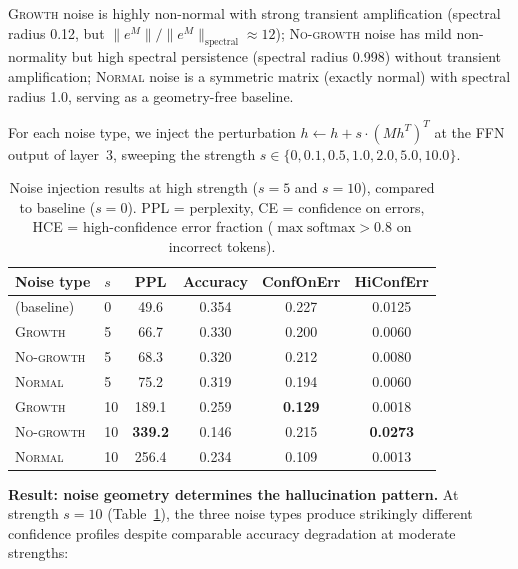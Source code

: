 \documentclass[11pt,a4paper]{article}
\theoremstyle{definition}
\begin{document}
\textsc{Growth} noise is highly non-normal with strong transient
amplification (spectral radius 0.12, but $\|e^M\|/\|e^M\|_{\text{spectral}} \approx 12$);
\textsc{No-growth} noise has mild non-normality but high spectral
persistence (spectral radius 0.998) without transient amplification;
\textsc{Normal} noise is a symmetric matrix (exactly normal) with
spectral radius 1.0, serving as a geometry-free baseline.

For each noise type, we inject the perturbation
$h \gets h + s \cdot (Mh^T)^T$ at the FFN output of layer~3, sweeping
the strength $s \in \{0, 0.1, 0.5, 1.0, 2.0, 5.0, 10.0\}$.

\begin{table}[ht]
\centering
\caption{Noise injection results at high strength ($s = 5$ and $s = 10$),
compared to baseline ($s = 0$). PPL = perplexity, CE = confidence on
errors, HCE = high-confidence error fraction
($\max\mathrm{softmax} > 0.8$ on incorrect tokens).}
\label{tab:noise}
\begin{tabular}{@{}llcccc@{}}
\toprule
Noise type & $s$ & PPL & Accuracy & ConfOnErr & HiConfErr \\
\midrule
(baseline) & 0 & 49.6 & 0.354 & 0.227 & 0.0125 \\
\midrule
\textsc{Growth}    & 5  &  66.7 & 0.330 & 0.200 & 0.0060 \\
\textsc{No-growth} & 5  &  68.3 & 0.320 & 0.212 & 0.0080 \\
\textsc{Normal}    & 5  &  75.2 & 0.319 & 0.194 & 0.0060 \\
\midrule
\textsc{Growth}    & 10 & 189.1 & 0.259 & \textbf{0.129} & 0.0018 \\
\textsc{No-growth} & 10 & \textbf{339.2} & 0.146 & 0.215 & \textbf{0.0273} \\
\textsc{Normal}    & 10 & 256.4 & 0.234 & 0.109 & 0.0013 \\
\bottomrule
\end{tabular}
\end{table}

\textbf{Result: noise geometry determines the hallucination pattern.}
At strength $s = 10$ (Table~\ref{tab:noise}), the three noise types
produce strikingly different confidence profiles despite comparable
accuracy degradation at moderate strengths:
\end{document}
